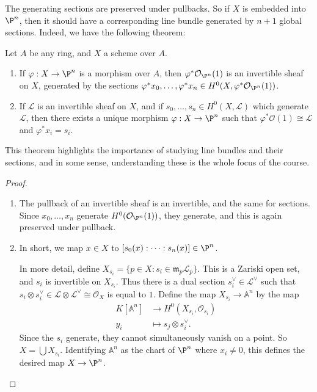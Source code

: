 \documentclass[a4paper]{article}
\newcommand\A{\mathbb{A}}
\begin{document}
The generating sections are preserved under pullbacks. So if $X$ is embedded into $\P^n$, then it should have a corresponding line bundle generated by $n + 1$ global sections. Indeed, we have the following theorem:
\begin{thm}
  Let $A$ be any ring, and $X$ a scheme over $A$.
  \begin{enumerate}
    \item If $\varphi: X \to \P^n$ is a morphism over $A$, then $\varphi^* \mathcal{O}_{\P^n}(1)$ is an invertible sheaf on $X$, generated by the sections $\varphi^* x_0, \ldots, \varphi^* x_n \in H^0(X, \varphi^* \mathcal{O}_{\P^n}(1))$.
    \item If $\mathcal{L}$ is an invertible sheaf on $X$, and if $s_0, \ldots, s_n \in H^0(X, \mathcal{L})$ which generate $\mathcal{L}$, then there exists a unique morphism $\varphi: X \to \P^n$ such that $\varphi^* \mathcal{O}(1) \cong \mathcal{L}$ and $\varphi^* x_i = s_i$.
  \end{enumerate}
\end{thm}

This theorem highlights the importance of studying line bundles and their sections, and in some sense, understanding these is the whole focus of the course.

\begin{proof}\leavevmode
  \begin{enumerate}
    \item The pullback of an invertible sheaf is an invertible, and the same for sections. Since $x_0, \ldots, x_n$ generate $H^0(\mathcal{O}_{\P^n}(1))$, they generate, and this is again preserved under pullback.
    \item In short, we map $x \in X$ to $[s_0(x): \cdots : s_n(x)] \in \P^n$.

      In more detail, define $X_{s_i} = \{p \in X: s_i \in \mathfrak{m}_p \mathcal{L}_p\}$. This is a Zariski open set, and $s_i$ is invertible on $X_{s_i}$. Thus there is a dual section $s_i^\vee \in \mathcal{L}^{\vee}$ such that $s_i \otimes s_i^\vee \in \mathcal{L} \otimes \mathcal{L}^\vee \cong \mathcal{O}_X$ is equal to $1$. Define the map $X_{s_i} \to \A^n$ by the map
      \begin{align*}
        K[\A^n] &\to H^0(X_{s_i}, \mathcal{O}_{s_i})\\
        y_i &\mapsto s_j \otimes s_i^\vee.
      \end{align*}
      Since the $s_i$ generate, they cannot simultaneously vanish on a point. So $X = \bigcup X_{s_i}$. Identifying $\A^n$ as the chart of $\P^n$ where $x_i \not= 0$, this defines the desired map $X \to \P^n$.\qedhere
  \end{enumerate}
\end{proof}
\end{document}
